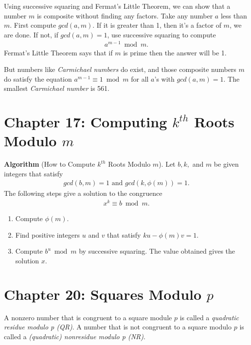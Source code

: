 \documentclass[graybox]{svmult}
\begin{document}
Using successive squaring and Fermat's Little Theorem, we can show that a number $m$ is composite without finding any factors. Take any number $a$ less than $m$. First compute $gcd(a,m)$. If it is greater than 1, then it's a factor of $m$, we are done. If not, if $gcd(a,m) = 1$, use successive squaring to compute
\begin{align*}
a^{m-1} \bmod m.
\end{align*}
Fermat's Little Theorem says that if $m$ is prime then the answer will be 1.

But numbers like \textit{Carmichael numbers} do exist, and those composite numbers $m$ do satisfy the equation $a^{m-1} \equiv 1 \bmod m$ for all $a$'s with $gcd(a,m)=1$. The smallest \textit{Carmichael number} is 561.

\section*{Chapter 17: Computing $k^{th}$ Roots Modulo $m$}

\textbf{Algorithm }(How to Compute $k^{th}$ Roots Modulo $m$). Let $b, k,$ and $m$ be given integers that satisfy
\begin{align*}
gcd(b,m)=1 \text{ and } gcd(k, \phi(m))=1.
\end{align*}
The following steps give a solution to the congruence
\begin{align*}
x^k \equiv b \bmod m.
\end{align*}
\begin{enumerate}
\item Compute $\phi(m)$.
\item Find positive integers $u$ and $v$ that satisfy $ku-\phi(m)v=1$.
\item Compute $b^u \bmod m$ by successive squaring. The value obtained gives the solution $x$.
\end{enumerate}

\section*{Chapter 20: Squares Modulo $p$}

\begin{definition}
A nonzero number that is congruent to a square module $p$ is called a \textit{quadratic residue modulo p (QR)}. A number that is not congruent to a square modulo $p$ is called a \textit{(quadratic) nonresidue modulo p (NR)}.
\end{definition}
\end{document}
